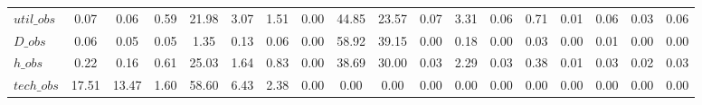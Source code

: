 \begin{center}
\begin{longtable}{lccccccccccccccccc}
$util\_obs      $	 & 	            0.07	 & 	            0.06	 & 	            0.59	 & 	           21.98	 & 	            3.07	 & 	            1.51	 & 	            0.00	 & 	           44.85	 & 	           23.57	 & 	            0.07	 & 	            3.31	 & 	            0.06	 & 	            0.71	 & 	            0.01	 & 	            0.06	 & 	            0.03	 & 	            0.06 \\ 
$D\_obs         $	 & 	            0.06	 & 	            0.05	 & 	            0.05	 & 	            1.35	 & 	            0.13	 & 	            0.06	 & 	            0.00	 & 	           58.92	 & 	           39.15	 & 	            0.00	 & 	            0.18	 & 	            0.00	 & 	            0.03	 & 	            0.00	 & 	            0.01	 & 	            0.00	 & 	            0.00 \\ 
$h\_obs         $	 & 	            0.22	 & 	            0.16	 & 	            0.61	 & 	           25.03	 & 	            1.64	 & 	            0.83	 & 	            0.00	 & 	           38.69	 & 	           30.00	 & 	            0.03	 & 	            2.29	 & 	            0.03	 & 	            0.38	 & 	            0.01	 & 	            0.03	 & 	            0.02	 & 	            0.03 \\ 
$tech\_obs      $	 & 	           17.51	 & 	           13.47	 & 	            1.60	 & 	           58.60	 & 	            6.43	 & 	            2.38	 & 	            0.00	 & 	            0.00	 & 	            0.00	 & 	            0.00	 & 	            0.00	 & 	            0.00	 & 	            0.00	 & 	            0.00	 & 	            0.00	 & 	            0.00	 & 	            0.00 \\ 
\end{longtable}
 \end{center}
